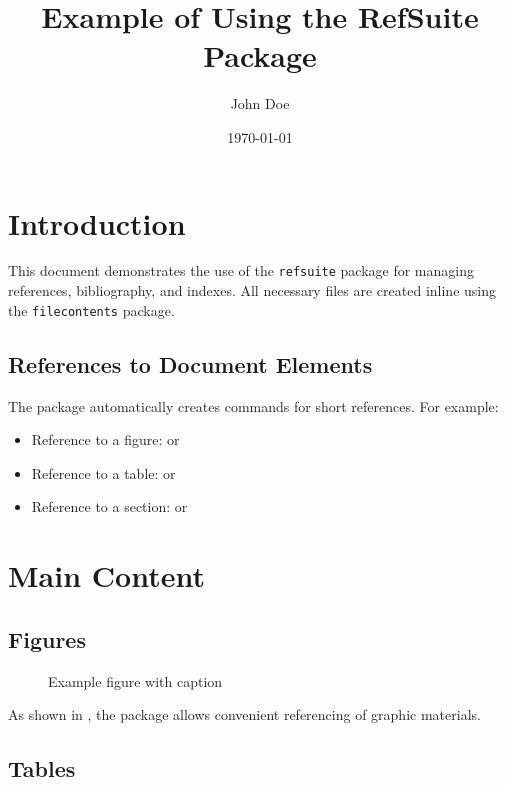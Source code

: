 \documentclass{article}
\begin{document}
\title{Example of Using the RefSuite Package}
\author{John Doe}
\date{\today}
\maketitle

\tableofcontents

\section{Introduction}

This document demonstrates the use of the \texttt{refsuite} package for managing references, bibliography, and indexes. All necessary files are created inline using the \texttt{filecontents} package.

\subsection{References to Document Elements}

The package automatically creates commands for short references. For example:

\begin{itemize}
    \item Reference to a figure:  or 
    \item Reference to a table:  or 
    \item Reference to a section:  or 
\end{itemize}

\section{Main Content}

\subsection{Figures}

\begin{figure}[htbp]
    \centering
    \caption{Example figure with caption}
    \label{fig:sample}
\end{figure}

As shown in , the package allows convenient referencing of graphic materials.

\subsection{Tables}
\end{document}

